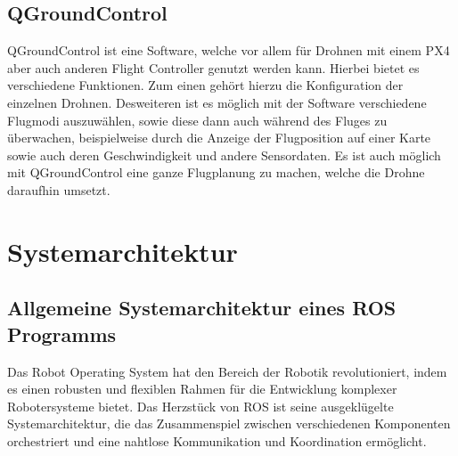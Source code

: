 \subsection{QGroundControl}  \label{qGroundControl:subsection}
QGroundControl ist eine Software, welche vor allem für Drohnen mit einem PX4 aber auch anderen Flight Controller genutzt werden kann. Hierbei bietet es verschiedene Funktionen. Zum einen gehört hierzu die Konfiguration der einzelnen  Drohnen. Desweiteren ist es möglich mit der Software verschiedene Flugmodi auszuwählen, sowie diese dann auch während des Fluges zu überwachen, beispielweise durch die Anzeige der Flugposition auf einer Karte sowie auch deren Geschwindigkeit und andere Sensordaten.
Es ist auch möglich mit QGroundControl eine ganze Flugplanung zu machen, welche die Drohne daraufhin umsetzt. \cite[vgl.][]{qGroundControl}


\section{Systemarchitektur}\label{systemarchitektur:section}

\subsection{Allgemeine Systemarchitektur eines ROS Programms} \label{systemarchitektur_ros_programm:subsection}
Das Robot Operating System hat den Bereich der Robotik revolutioniert, indem es einen robusten und flexiblen Rahmen für die Entwicklung komplexer Robotersysteme bietet. Das Herzstück von \ac{ROS} ist seine ausgeklügelte Systemarchitektur, die das Zusammenspiel zwischen verschiedenen Komponenten orchestriert und eine nahtlose Kommunikation und Koordination ermöglicht.

